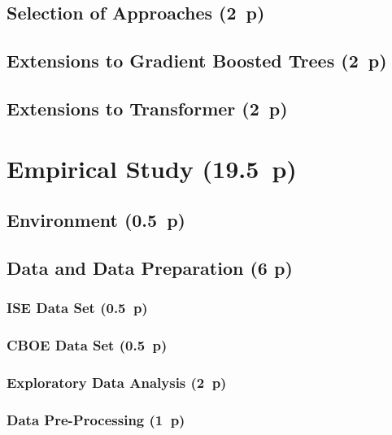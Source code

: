 \subsection{Selection of Approaches (2~p)}\label{sec:selection-of-approaches-1}

\subsection{Extensions to Gradient Boosted
Trees (2~p)}\label{sec:extensions-to-gradient-boosted-trees}

\subsection{Extensions to Transformer (2~p)}\label{sec:extensions-to-transformer}


\newpage
\section{Empirical Study (19.5~p)}\label{sec:empirical-study}

\subsection{Environment (0.5~p)}\label{sec:environment}

\subsection{Data and Data Preparation (6 p)}\label{sec:data-and-data-preparation}

\subsubsection{ISE Data Set (0.5~p)}\label{sec:ise-data-set}

\subsubsection{CBOE Data Set (0.5~p)}\label{sec:cboe-data-set}

\subsubsection{Exploratory Data Analysis (2~p)}\label{sec:exploratory-data-analysis}

\subsubsection{Data Pre-Processing (1~p)}\label{sec:data-preprocessing}

